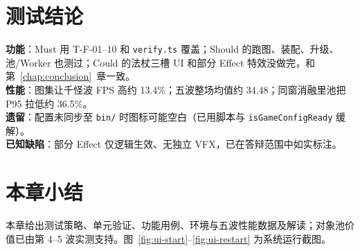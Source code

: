 \section{测试结论}

\textbf{功能}：Must 用 T-F-01--10 和 \texttt{verify.ts} 覆盖；Should 的跑图、装配、升级、池/Worker 也测过；Could 的法杖三槽 UI 和部分 Effect 特效没做完，和第~\ref{chap:conclusion}~章一致。\\
\textbf{性能}：图集让千怪波 FPS 高约 13.4\%；五波整场均值约 34.48；同窗消融里池把 P95 拉低约 36.5\%。\\
\textbf{遗留}：配置未同步至 \texttt{bin/} 时图标可能空白（已用脚本与 \texttt{isGameConfigReady} 缓解）。\\
\textbf{已知缺陷}：部分 Effect 仅逻辑生效、无独立 VFX，已在答辩范围中如实标注。

\section{本章小结}

本章给出测试策略、单元验证、功能用例、环境与五波性能数据及解读；对象池价值已由第 4--5 波实测支持。图~\ref{fig:ui-start}--\ref{fig:ui-restart} 为系统运行截图。
